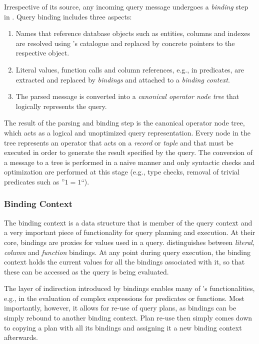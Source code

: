 Irrespective of its source, any incoming query message undergoes a \emph{binding} step in \cottontail{}. Query binding includes three aspects:

\begin{enumerate}
    \item Names that reference database objects such as entities, columns and indexes are resolved using \cottontail{}'s catalogue and replaced by concrete pointers to the respective object.
    \item Literal values, function calls and column references, e.g., in predicates, are extracted and replaced by \emph{bindings} and attached to a \emph{binding context}.
    \item The parsed message is converted into a \emph{canonical operator node tree} that logically represents the query.
\end{enumerate}

The result of the parsing and binding step is the canonical operator node tree, which acts as a logical and unoptimized query representation.  Every node in the tree represents an operator that acts on a \emph{record} or \emph{tuple} and that must be executed in order to generate the result specified by the query. The conversion of a message to a tree is performed in a naive manner and only syntactic checks and optimization are performed at this stage (e.g., type checks, removal of trivial predicates such as ''$1 = 1$``).

\subsubsection{Binding Context}
The binding context is a data structure that is member of the query context and a very important piece of functionality for query planning and execution. At their core, bindings are proxies for values used in a query. \cottontail{} distinguishes between \emph{literal}, \emph{column} and \emph{function} bindings. At any point during query execution, the binding context holds the current values for all the bindings associated with it, so that these can be accessed as the query is being evaluated.

The layer of indirection introduced by bindings enables many of \cottontail{}'s functionalities, e.g., in the evaluation of complex expressions for predicates or functions. Most importantly, however, it allows for re-use of query plans, as bindings can be simply rebound to another binding context. Plan re-use then simply comes down to copying a plan with all its bindings and assigning it a new binding context afterwards. 


